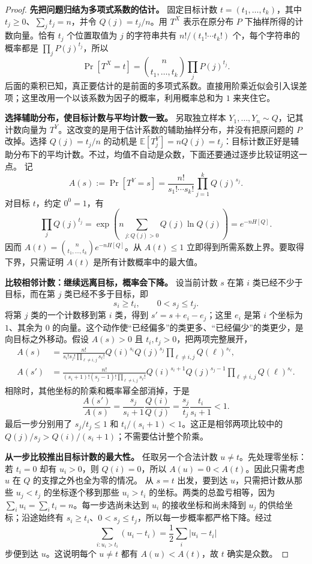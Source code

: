 \documentclass[lang=cn,a4paper,fontset=none,zihao=false,10pt,openany,twoside]{beautybook}
\numberwithin{algorithm}{chapter}
\begin{document}
\begin{proof}
\textbf{先把问题归结为多项式系数的估计。}
固定目标计数 $t=(t_1,\ldots,t_k)$，其中 $t_j\ge0$、$\sum_jt_j=n$，并令 $Q(j)=t_j/n$。用 $T^X$ 表示在原分布 $P$ 下抽样所得的计数向量。恰有 $t_j$ 个位置取值为 $j$ 的字符串共有 $n!/(t_1!\cdots t_k!)$ 个，每个字符串的概率都是 $\prod_jP(j)^{t_j}$，所以
\[
 \Pr[T^X=t]=\binom n{t_1,\ldots,t_k}\prod_jP(j)^{t_j}.
\]
后面的乘积已知，真正要估计的是前面的多项式系数。直接用阶乘近似会引入误差项；这里改用一个以该系数为因子的概率，利用概率总和为 $1$ 来夹住它。

\textbf{选择辅助分布，使目标计数与平均计数一致。}
另取独立样本 $Y_1,\ldots,Y_n\sim Q$，记其计数向量为 $T^Y$。这改变的是用于估计系数的辅助抽样分布，并没有把原问题的 $P$ 改掉。选择 $Q(j)=t_j/n$ 的动机是 $\mathbb E[T_j^Y]=nQ(j)=t_j$：目标计数正好是辅助分布下的平均计数。不过，均值不自动是众数，下面还要通过逐步比较证明这一点。
记
\[
 A(s):=\Pr[T^Y=s]=\frac{n!}{s_1!\cdots s_k!}\prod_{j=1}^kQ(j)^{s_j}.
\]
对目标 $t$，约定 $0^0=1$，有
\[
 \prod_jQ(j)^{t_j}
 =\exp\left(n\sum_{j:Q(j)>0}Q(j)\ln Q(j)\right)=e^{-nH[Q]}.
\]
因而 $A(t)=\binom n{t_1,\ldots,t_k}e^{-nH[Q]}$。从 $A(t)\le1$ 立即得到所需系数上界。要取得下界，只需证明 $A(t)$ 是所有计数概率中的最大值。

\textbf{比较相邻计数：继续远离目标，概率会下降。}
设当前计数 $s$ 在第 $i$ 类已经不少于目标，而在第 $j$ 类已经不多于目标，即
\[
 s_i\ge t_i,\qquad 0<s_j\le t_j.
\]
将第 $j$ 类的一个计数移到第 $i$ 类，得到
$s'=s+e_i-e_j$；这里 $e_i$ 是第 $i$ 个坐标为 $1$、其余为 $0$ 的向量。这个动作使“已经偏多”的类更多、“已经偏少”的类更少，是向目标之外移动。假设 $A(s)>0$ 且 $t_i,t_j>0$，把两项完整展开，
\begin{align*}
 A(s)&=\frac{n!}{s_i!s_j!\prod_{\ell\ne i,j}s_\ell!}
 Q(i)^{s_i}Q(j)^{s_j}\prod_{\ell\ne i,j}Q(\ell)^{s_\ell},\\
 A(s')&=\frac{n!}{(s_i+1)!(s_j-1)!\prod_{\ell\ne i,j}s_\ell!}
 Q(i)^{s_i+1}Q(j)^{s_j-1}\prod_{\ell\ne i,j}Q(\ell)^{s_\ell}.
\end{align*}
相除时，其他坐标的阶乘和概率幂全部消掉，于是
\[
 \frac{A(s')}{A(s)}
 =\frac{s_j}{s_i+1}\frac{Q(i)}{Q(j)}
 =\frac{s_j}{t_j}\frac{t_i}{s_i+1}<1.
\]
最后一步分别用了 $s_j/t_j\le1$ 和 $t_i/(s_i+1)<1$。这正是相邻两项比较中的
$Q(j)/s_j>Q(i)/(s_i+1)$；不需要估计整个阶乘。

\textbf{从一步比较推出目标计数的最大性。}
任取另一个合法计数 $u\ne t$。先处理零坐标：若 $t_i=0$ 却有 $u_i>0$，则 $Q(i)=0$，所以 $A(u)=0<A(t)$。因此只需考虑 $u$ 在 $Q$ 的支撑之外也全为零的情况。
从 $s=t$ 出发，要到达 $u$，只需把计数从那些 $u_j<t_j$ 的坐标逐个移到那些 $u_i>t_i$ 的坐标。两类的总盈亏相等，因为 $\sum_i u_i=\sum_i t_i=n$。每一步选尚未达到 $u_i$ 的接收坐标和尚未降到 $u_j$ 的供给坐标；沿途始终有 $s_i\ge t_i$、$0<s_j\le t_j$，所以每一步概率都严格下降。经过
\[
 \sum_{i:u_i>t_i}(u_i-t_i)=\frac12\sum_i|u_i-t_i|
\]
步便到达 $u$。这说明每个 $u\ne t$ 都有 $A(u)<A(t)$，故 $t$ 确实是众数。


\end{proof}
\end{document}
